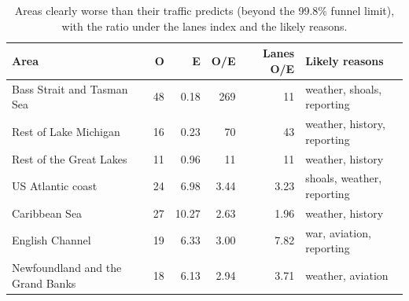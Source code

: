 \documentclass[11pt,a4paper]{article}
\begin{document}
\begin{table}[tbp]\centering\small\caption{Areas clearly worse than their traffic predicts (beyond the 99.8\% funnel limit), with the ratio under the lanes index and the likely reasons.}\label{tab:worse}\begin{tabular}{p{4.6cm}rrrrp{3.6cm}}\toprule Area & O & E & O/E & Lanes O/E & Likely reasons\\\midrule
Bass Strait and Tasman Sea & 48 & 0.18 & 269 & 11 & weather, shoals, reporting\\
Rest of Lake Michigan & 16 & 0.23 & 70 & 43 & weather, history, reporting\\
Rest of the Great Lakes & 11 & 0.96 & 11 & 11 & weather, history\\
US Atlantic coast & 24 & 6.98 & 3.44 & 3.23 & shoals, weather, reporting\\
Caribbean Sea & 27 & 10.27 & 2.63 & 1.96 & weather, history\\
English Channel & 19 & 6.33 & 3.00 & 7.82 & war, aviation, reporting\\
Newfoundland and the Grand Banks & 18 & 6.13 & 2.94 & 3.71 & weather, aviation\\
\bottomrule\end{tabular}\end{table}
\end{document}
